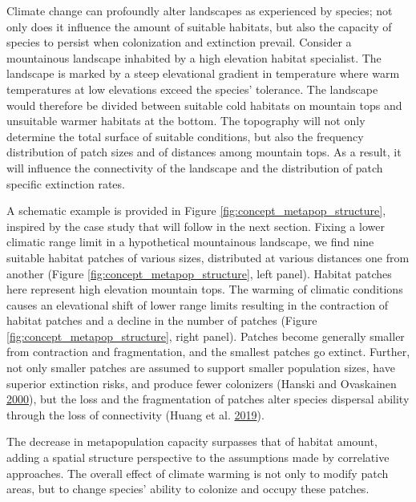 \documentclass[12pt]{article}
\begin{document}
Climate change can profoundly alter landscapes as experienced by
species; not only does it influence the amount of suitable habitats, but
also the capacity of species to persist when colonization and extinction
prevail. Consider a mountainous landscape inhabited by a high elevation
habitat specialist. The landscape is marked by a steep elevational
gradient in temperature where warm temperatures at low elevations exceed
the species' tolerance. The landscape would therefore be divided between
suitable cold habitats on mountain tops and unsuitable warmer habitats
at the bottom. The topography will not only determine the total surface
of suitable conditions, but also the frequency distribution of patch
sizes and of distances among mountain tops. As a result, it will
influence the connectivity of the landscape and the distribution of
patch specific extinction rates.

A schematic example is provided in Figure
\ref{fig:concept_metapop_structure}, inspired by the case study that
will follow in the next section. Fixing a lower climatic range limit in
a hypothetical mountainous landscape, we find nine suitable habitat
patches of various sizes, distributed at various distances one from
another (Figure \ref{fig:concept_metapop_structure}, left panel).
Habitat patches here represent high elevation mountain tops. The warming
of climatic conditions causes an elevational shift of lower range limits
resulting in the contraction of habitat patches and a decline in the
number of patches (Figure \ref{fig:concept_metapop_structure}, right
panel). Patches become generally smaller from contraction and
fragmentation, and the smallest patches go extinct. Further, not only
smaller patches are assumed to support smaller population sizes, have
superior extinction risks, and produce fewer colonizers (Hanski and
Ovaskainen \protect\hyperlink{ref-hanski_metapopulation_2000}{2000}),
but the loss and the fragmentation of patches alter species dispersal
ability through the loss of connectivity (Huang et al.
\protect\hyperlink{ref-huang_using_2019}{2019}).

The decrease in metapopulation capacity surpasses that of habitat
amount, adding a spatial structure perspective to the assumptions made
by correlative approaches. The overall effect of climate warming is not
only to modify patch areas, but to change species' ability to colonize
and occupy these patches.
\end{document}
